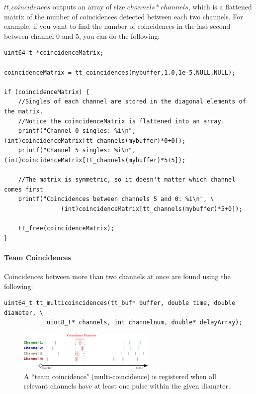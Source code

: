 \documentclass[10pt]{article}
\begin{document}
$tt\_coincidences$ outputs an array of size $channels*channels$, which is a flattened matrix of the number of coincidences detected between each two channels. For example,
if you want to find the number of coincidences in the last second between channel 0 and 5, you can do the following:

\begin{verbatim}
uint64_t *coincidenceMatrix;

coincidenceMatrix = tt_coincidences(mybuffer,1.0,1e-5,NULL,NULL);

if (coincidenceMatrix) {
    //Singles of each channel are stored in the diagonal elements of the matrix.
    //Notice the coincidenceMatrix is flattened into an array.
    printf("Channel 0 singles: %i\n", (int)coincidenceMatrix[tt_channels(mybuffer)*0+0]);
    printf("Channel 5 singles: %i\n", (int)coincidenceMatrix[tt_channels(mybuffer)*5+5]);

    //The matrix is symmetric, so it doesn't matter which channel comes first
    printf("Coincidences between channels 5 and 0: %i\n", \
                (int)coincidenceMatrix[tt_channels(mybuffer)*5+0]);

    tt_free(coincidenceMatrix);
}
\end{verbatim}

\paragraph{Team Coincidences} Coincidences between more than two channels at once are found using the following:

\begin{verbatim}
uint64_t tt_multicoincidences(tt_buf* buffer, double time, double diameter, \
            uint8_t* channels, int channelnum, double* delayArray);
\end{verbatim}

\begin{figure}
\begin{center}
\includegraphics[width=250px]{multicoincidence.png}
\caption{A ``team coincidence" (multi-coincidence) is registered when all relevant channels have at least one pulse within the given diameter.}
\label{fig:multicoincidence}
\end{center}
\end{figure}
\end{document}
